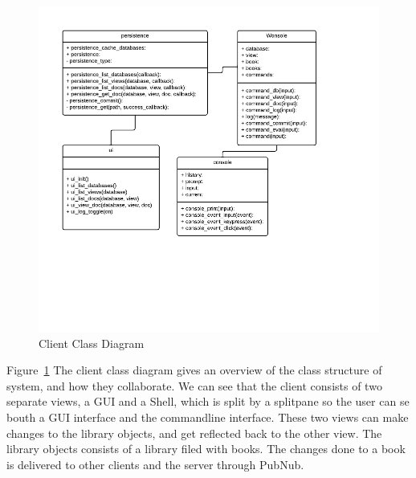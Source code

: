 \begin{figure}
\centering
\includegraphics[width=6in]{image/clientClassDiagram.png}
\caption{Client Class Diagram}
\label{figure:clientClassDiagram}
\end{figure}

Figure~\ref{figure:clientClassDiagram} The client class diagram gives an overview of the class structure of system, and how they collaborate. We can see that the client consists of two separate views, a GUI and a Shell, which is split by a splitpane so the user can se bouth a GUI interface and the commandline interface. These two views can make changes to the library objects, and get reflected back to the other view. The library objects consists of a library filed with books. The changes done to a book is delivered to other clients and the server through PubNub. 

